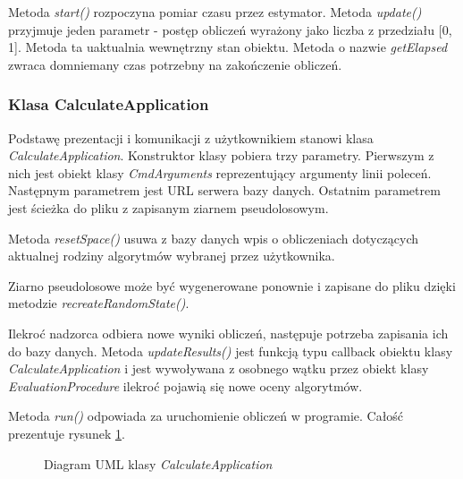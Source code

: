 \documentclass[../thesis.tex]{subfiles}
\begin{document}
Metoda \emph{start()} rozpoczyna pomiar czasu przez estymator. Metoda \emph{update()} przyjmuje jeden parametr - postęp obliczeń wyrażony jako liczba z przedziału [0, 1]. Metoda ta uaktualnia wewnętrzny stan obiektu. Metoda o nazwie \emph{getElapsed} zwraca domniemany czas potrzebny na zakończenie obliczeń.

\subsubsection{Klasa CalculateApplication}

Podstawę prezentacji i komunikacji z użytkownikiem stanowi klasa \emph{CalculateApplication}. Konstruktor klasy pobiera trzy parametry. Pierwszym z nich jest obiekt klasy \emph{CmdArguments} reprezentujący argumenty linii poleceń. Następnym parametrem jest URL serwera bazy danych. Ostatnim parametrem jest ścieżka do pliku z zapisanym ziarnem pseudolosowym.

Metoda \emph{resetSpace()} usuwa z bazy danych wpis o obliczeniach dotyczących aktualnej rodziny algorytmów wybranej przez użytkownika. 

Ziarno pseudolosowe może być wygenerowane ponownie i zapisane do pliku dzięki metodzie \emph{recreateRandomState()}.

Ilekroć nadzorca odbiera nowe wyniki obliczeń, następuje potrzeba zapisania ich do bazy danych. Metoda \emph{updateResults()} jest funkcją typu callback obiektu klasy \emph{CalculateApplication} i jest wywoływana z osobnego wątku przez obiekt klasy \emph{EvaluationProcedure} ilekroć pojawią się nowe oceny algorytmów.

Metoda \emph{run()} odpowiada za uruchomienie obliczeń w programie. Całość prezentuje rysunek \ref{proj:diagram_calculate_application}.

\begin{figure}[h]
\centering
{}
\caption{Diagram UML klasy \emph{CalculateApplication}}
\label{proj:diagram_calculate_application}
\end{figure}
\end{document}

